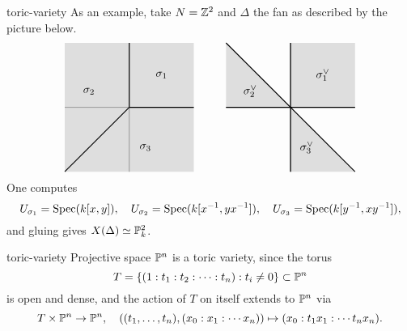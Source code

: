 \begin{example}{toric-variety}
    As an example, take $N = \mathbb{Z}^2$ and $\Delta$ the fan as described by the picture below.
    \[ \begin{tikzpicture}
        \begin{scope}
            \draw (-2, 0) -- (2, 0);
            \draw (0, -2) -- (0, 2);
            \fill[fill=gray!50, opacity=0.5] (-2, -2) -- (2, -2) -- (2, 2) -- (-2, 2);
            \draw[thick] (0, 0) -- (2, 0);
            \draw[thick] (0, 0) -- (0, 2);
            \draw[thick] (0, 0) -- (-2, -2);
            \node at (1, 1) {$\sigma_1$};
            \node at (-1.25, 0.5) {$\sigma_2$};
            \node at (0.5, -1.25) {$\sigma_3$};
        \end{scope}
        \begin{scope}[shift={(5, 0)}]
            \draw (-2, 0) -- (2, 0);
            \draw (0, -2) -- (0, 2);
            \fill[fill=gray!50, opacity=0.5] (0, 0) -- (2, 0) -- (2, 2) -- (0, 2);
            \fill[fill=gray!50, opacity=0.5] (0, 0) -- (-2, 0) -- (-2, 2);
            \fill[fill=gray!50, opacity=0.5] (0, 0) -- (0, -2) -- (2, -2);
            \draw[thick] (-2, 0) -- (2, 0);
            \draw[thick] (0, -2) -- (0, 2);
            \draw[thick] (-2, 2) -- (2, -2);
            \node at (1, 1) {$\sigma_1^\vee$};
            \node at (-1.25, 0.5) {$\sigma_2^\vee$};
            \node at (0.5, -1.25) {$\sigma_3^\vee$};
        \end{scope}
    \end{tikzpicture} \]
    One computes
    \[ U_{\sigma_1} = \operatorname{Spec}(k[x, y]), \quad U_{\sigma_2} = \operatorname{Spec}(k[x^{-1}, yx^{-1}]), \quad U_{\sigma_3} = \operatorname{Spec}(k[y^{-1}, xy^{-1}]) , \]
    and gluing gives $X(\Delta) \simeq \mathbb{P}_k^2$.    
\end{example}

\begin{example}{toric-variety}
    Projective space $\mathbb{P}^n$ is a toric variety, since the torus
    \[ T = \{ (1 : t_1 : t_2 : \cdots : t_n) : t_i \ne 0 \} \subset \mathbb{P}^n \]
    is open and dense, and the action of $T$ on itself extends to $\mathbb{P}^n$ via
    \[ T \times \mathbb{P}^n \to \mathbb{P}^n, \quad \left( (t_1, \ldots, t_n), (x_0 : x_1 : \cdots x_n) \right) \mapsto (x_0 : t_1 x_1 : \cdots t_n x_n) . \]
\end{example}

